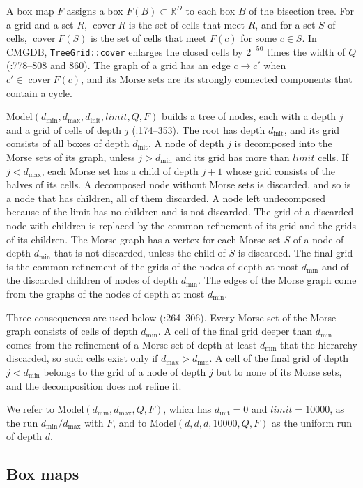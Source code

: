\documentclass[11pt]{article}
\theoremstyle{plain}
\theoremstyle{definition}
\theoremstyle{remark}
\DeclareMathOperator{\cover}{cover}
\newcommand{\R}{\mathbb{R}}
\newcommand{\dmin}{d_{\min}}
\newcommand{\dmax}{d_{\max}}
\newcommand{\dinit}{d_{\mathrm{init}}}
\newcommand{\code}[1]{\texttt{#1}}
\begin{document}
A box map $F$ assigns a box $F(B)\subset\R^D$ to each box $B$ of the bisection tree. For a grid and a set $R$, $\cover R$ is the set of cells that meet $R$, and for a set $S$ of cells, $\cover F(S)$ is the set of cells that meet $F(c)$ for some $c\in S$. In CMGDB, \code{TreeGrid::cover} enlarges the closed cells by $2^{-50}$ times the width of $Q$ (:778--808 and 860). The graph of a grid has an edge $c\to c'$ when $c'\in\cover F(c)$, and its Morse sets are its strongly connected components that contain a cycle.

$\mathrm{Model}(\dmin,\dmax,\dinit,\mathit{limit},Q,F)$ builds a tree of nodes, each with a depth $j$ and a grid of cells of depth $j$ (:174--353). The root has depth $\dinit$, and its grid consists of all boxes of depth $\dinit$. A node of depth $j$ is decomposed into the Morse sets of its graph, unless $j>\dmin$ and its grid has more than $\mathit{limit}$ cells. If $j<\dmax$, each Morse set has a child of depth $j+1$ whose grid consists of the halves of its cells. A decomposed node without Morse sets is discarded, and so is a node that has children, all of them discarded. A node left undecomposed because of the limit has no children and is not discarded. The grid of a discarded node with children is replaced by the common refinement of its grid and the grids of its children. The Morse graph has a vertex for each Morse set $S$ of a node of depth $\dmin$ that is not discarded, unless the child of $S$ is discarded. The final grid is the common refinement of the grids of the nodes of depth at most $\dmin$ and of the discarded children of nodes of depth $\dmin$. The edges of the Morse graph come from the graphs of the nodes of depth at most $\dmin$.

Three consequences are used below (:264--306). Every Morse set of the Morse graph consists of cells of depth $\dmin$. A cell of the final grid deeper than $\dmin$ comes from the refinement of a Morse set of depth at least $\dmin$ that the hierarchy discarded, so such cells exist only if $\dmax>\dmin$. A cell of the final grid of depth $j<\dmin$ belongs to the grid of a node of depth $j$ but to none of its Morse sets, and the decomposition does not refine it.

We refer to $\mathrm{Model}(\dmin,\dmax,Q,F)$, which has $\dinit=0$ and $\mathit{limit}=10000$, as the run $\dmin/\dmax$ with $F$, and to $\mathrm{Model}(d,d,d,10000,Q,F)$ as the uniform run of depth $d$.

\subsection{Box maps}\label{sec:boxmaps}
\end{document}
